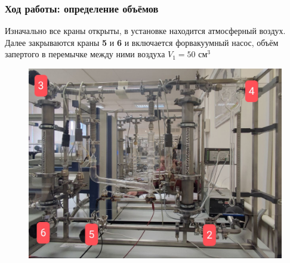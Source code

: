 \documentclass[xcolor=table]{beamer}
\begin{document}
\begin{frame}\frametitle{Ход работы: определение объёмов}
    Изначально все краны открыты, в установке находится атмосферный воздух. Далее закрываются краны \textbf{5} и \textbf{6} и включается форвакуумный насос, объём запертого в перемычке между ними воздуха \(V_1 = 50 \text{ см}^3\)
    \begin{figure}
        \centering
        \includegraphics[scale=0.19]{images/valve.jpg}
    \end{figure}
\end{frame}
\end{document}
